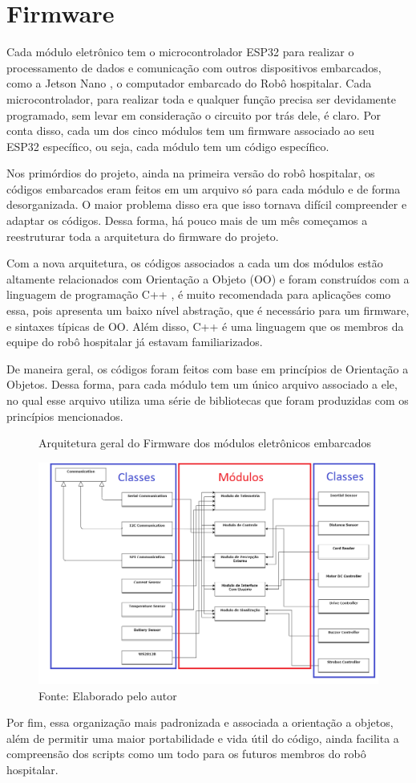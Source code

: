 \documentclass[../poliXuniversity_hospital_-USP-report.tex]{subfiles}
\begin{document}
\clearpage
\section{Firmware}

Cada módulo eletrônico tem o microcontrolador ESP32 \cite{esp32} para realizar o processamento de dados e comunicação com outros dispositivos embarcados, como a Jetson Nano \cite{jetson21}, o computador embarcado do Robô hospitalar. Cada microcontrolador, para realizar toda e qualquer função precisa ser devidamente programado, sem levar em consideração o circuito por trás dele, é claro. Por conta disso, cada um dos cinco módulos tem um firmware associado ao seu ESP32 específico, ou seja, cada módulo tem um código específico.

Nos primórdios do projeto, ainda na primeira versão do robô hospitalar, os códigos embarcados eram feitos em um arquivo só para cada módulo e de forma desorganizada. O maior problema disso era que isso tornava difícil compreender e adaptar os códigos. Dessa forma, há pouco mais de um mês começamos a reestruturar toda a arquitetura do firmware do projeto.

Com a nova arquitetura, os códigos associados a cada um dos módulos estão altamente relacionados com Orientação a Objeto (OO) e foram construídos com a linguagem de programação C++ \cite{c++21}, é muito recomendada para aplicações como essa, pois apresenta um baixo nível abstração, que é necessário para um firmware, e sintaxes típicas de OO. Além disso, C++ é uma linguagem que os membros da equipe do robô hospitalar já estavam familiarizados.

De maneira geral, os códigos foram feitos com base em princípios de Orientação a Objetos. Dessa forma, para cada módulo tem um único arquivo associado a ele, no qual esse arquivo utiliza uma série de bibliotecas que foram produzidas com os princípios mencionados.

\begin{figure}[!h]
\centering
    \caption{Arquitetura geral do Firmware dos módulos eletrônicos embarcados }
    \centering %
    \includegraphics[width=17cm]{modulos/classes_firmware.png}
    \caption*{Fonte: Elaborado pelo autor }
    \label{Protótipo placa de ## - Esquemático principal}
\end{figure}

Por fim, essa organização mais padronizada e associada a orientação a objetos, além de permitir uma maior portabilidade e vida útil do código, ainda facilita a compreensão dos  scripts como um todo para os futuros membros do robô hospitalar.
\end{document}
